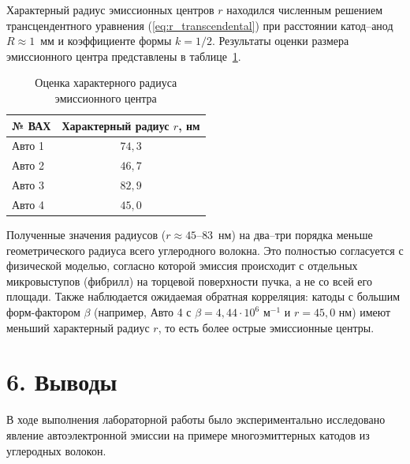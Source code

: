 \documentclass[12pt, a4paper]{article}
\begin{document}
Характерный радиус эмиссионных центров $r$ находился численным решением трансцендентного уравнения (\ref{eq:r_transcendental}) при расстоянии катод--анод $R \approx 1$~мм и коэффициенте формы $k = 1/2$. Результаты оценки размера эмиссионного центра представлены в таблице~\ref{tab:r_auto}.

\begin{table}[H]
\centering
\caption{Оценка характерного радиуса эмиссионного центра}
\label{tab:r_auto}
\begin{tabular}{|l|c|}
\hline
№ ВАХ & Характерный радиус $r$, нм \\
\hline
Авто 1 & $74{,}3$ \\
Авто 2 & $46{,}7$ \\
Авто 3 & $82{,}9$ \\
Авто 4 & $45{,}0$ \\
\hline
\end{tabular}
\end{table}

Полученные значения радиусов ($r \approx 45$--$83$~нм) на два--три порядка меньше геометрического радиуса всего углеродного волокна. Это полностью согласуется с физической моделью, согласно которой эмиссия происходит с отдельных микровыступов (фибрилл) на торцевой поверхности пучка, а не со всей его площади. Также наблюдается ожидаемая обратная корреляция: катоды с большим форм-фактором $\beta$ (например, Авто 4 с $\beta = 4{,}44 \cdot 10^6$ м$^{-1}$ и $r = 45{,}0$ нм) имеют меньший характерный радиус $r$, то есть более острые эмиссионные центры.


\section*{6. Выводы}

В ходе выполнения лабораторной работы было экспериментально исследовано явление автоэлектронной эмиссии на примере многоэмиттерных катодов из углеродных волокон.
\end{document}
